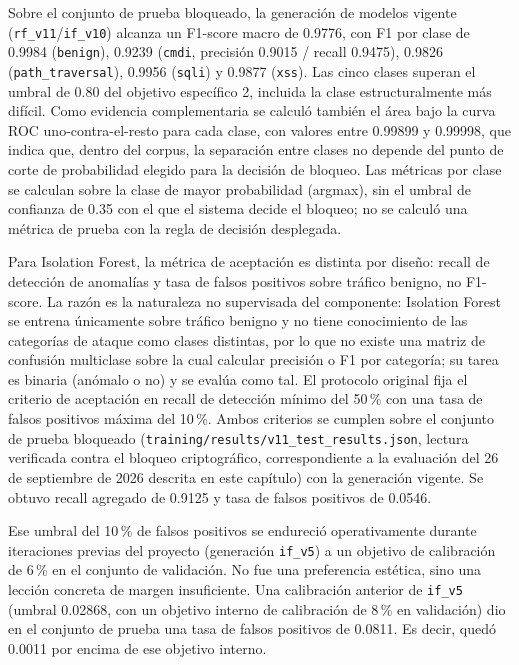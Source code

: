 Sobre el conjunto de prueba bloqueado, la generación de modelos vigente (\texttt{rf\_v11}/\texttt{if\_v10}) alcanza un F1-score macro de 0.9776, con F1 por clase de 0.9984 (\texttt{benign}), 0.9239 (\texttt{cmdi}, precisión 0.9015 / recall 0.9475), 0.9826 (\texttt{path\_traversal}), 0.9956 (\texttt{sqli}) y 0.9877 (\texttt{xss}). Las cinco clases superan el umbral de 0.80 del objetivo específico 2, incluida la clase estructuralmente más difícil. Como evidencia complementaria se calculó también el área bajo la curva ROC uno-contra-el-resto \parencite{fawcett2006} para cada clase, con valores entre 0.99899 y 0.99998, que indica que, dentro del corpus, la separación entre clases no depende del punto de corte de probabilidad elegido para la decisión de bloqueo. Las métricas por clase se calculan sobre la clase de mayor probabilidad (argmax), sin el umbral de confianza de 0.35 con el que el sistema decide el bloqueo; no se calculó una métrica de prueba con la regla de decisión desplegada.

Para Isolation Forest, la métrica de aceptación es distinta por diseño: recall de detección de anomalías y tasa de falsos positivos sobre tráfico benigno, no F1-score. La razón es la naturaleza no supervisada del componente: Isolation Forest se entrena únicamente sobre tráfico benigno y no tiene conocimiento de las categorías de ataque como clases distintas, por lo que no existe una matriz de confusión multiclase sobre la cual calcular precisión o F1 por categoría; su tarea es binaria (anómalo o no) y se evalúa como tal. El protocolo original fija el criterio de aceptación en recall de detección mínimo del 50\,\% con una tasa de falsos positivos máxima del 10\,\%. Ambos criterios se cumplen sobre el conjunto de prueba bloqueado (\texttt{training/results/v11\_test\_results.json}, lectura verificada contra el bloqueo criptográfico, correspondiente a la evaluación del 26 de septiembre de 2026 descrita en este capítulo) con la generación vigente. Se obtuvo recall agregado de 0.9125 y tasa de falsos positivos de 0.0546.

Ese umbral del 10\,\% de falsos positivos se endureció operativamente durante iteraciones previas del proyecto (generación \texttt{if\_v5}) a un objetivo de calibración de 6\,\% en el conjunto de validación. No fue una preferencia estética, sino una lección concreta de margen insuficiente. Una calibración anterior de \texttt{if\_v5} (umbral 0.02868, con un objetivo interno de calibración de 8\,\% en validación) dio en el conjunto de prueba una tasa de falsos positivos de 0.0811. Es decir, quedó 0.0011 por encima de ese objetivo interno.

